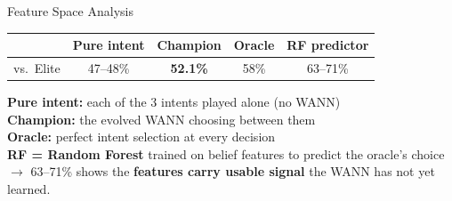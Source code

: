 \documentclass[10pt]{beamer}
\begin{document}
\begin{frame}{Feature Space Analysis}
  \centering
  \begin{tabular}{@{}lcccc@{}}
    \toprule
    & \textbf{Pure intent} & \textbf{Champion} & \textbf{Oracle} & \textbf{RF predictor} \\
    \midrule
    vs.\ Elite & 47--48\% & \textbf{52.1\%} & 58\% & 63--71\% \\
    \bottomrule
  \end{tabular}
  \vspace{8pt}

  \footnotesize
  \textbf{Pure intent:} each of the 3 intents played alone (no WANN)\\
  \textbf{Champion:} the evolved WANN choosing between them \\
  \textbf{Oracle:} perfect intent selection at every decision \\
  \textbf{RF = Random Forest} trained on belief features to predict the oracle's choice \\ \hspace{14pt}$\rightarrow$ 63--71\% shows the \textbf{features carry usable signal} the WANN has not yet learned.
\end{frame}
\end{document}

